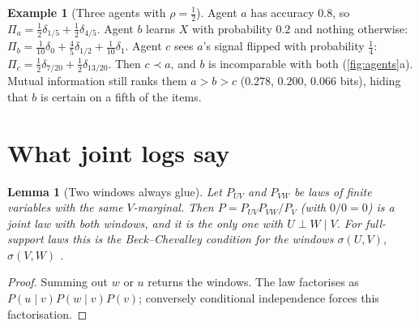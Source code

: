 \documentclass[11pt]{article}
\newtheorem{lemma}[theorem]{Lemma}
\theoremstyle{definition}
\newtheorem{example}[theorem]{Example}
\theoremstyle{remark}
\begin{document}
\begin{example}[Three agents with $\rho=\tfrac12$]\label{ex:three}
Agent $a$ has accuracy $0.8$, so $\Pi_a=\tfrac12\delta_{1/5}+\tfrac12\delta_{4/5}$. Agent $b$ learns $X$ with probability $0.2$ and nothing
otherwise: $\Pi_b=\tfrac1{10}\delta_0+\tfrac45\delta_{1/2}+\tfrac1{10}\delta_1$. Agent $c$ sees $a$'s signal flipped with probability
$\tfrac14$: $\Pi_c=\tfrac12\delta_{7/20}+\tfrac12\delta_{13/20}$. Then $c\prec a$, and $b$ is incomparable with both (\cref{fig:agents}a).
Mutual information still ranks them $a>b>c$ ($0.278$, $0.200$, $0.066$ bits), hiding that $b$ is certain on a fifth of the items.
\end{example}

\section{What joint logs say}
\begin{lemma}[Two windows always glue]\label{lem:glue}
Let $P_{UV}$ and $P_{VW}$ be laws of finite variables with the same $V$-marginal. Then $P=P_{UV}P_{VW}/P_V$ (with $0/0=0$) is a joint law
with both windows, and it is the only one with $U\perp W\mid V$. For full-support laws this is the Beck--Chevalley condition for the
windows $\sigma(U,V)$, $\sigma(V,W)$ \cite[Thm.~14.4]{Main}.
\end{lemma}
\begin{proof}
Summing out $w$ or $u$ returns the windows. The law factorises as $P(u\mid v)P(w\mid v)P(v)$; conversely conditional independence forces
this factorisation.
\end{proof}
\end{document}
